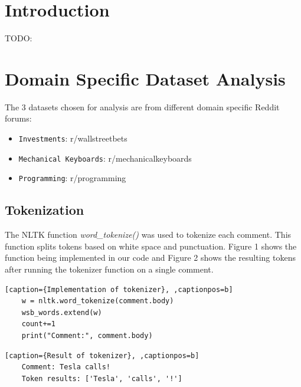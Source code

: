 \documentclass[sigconf,nonacm=true]{acmart}
\begin{document}
\maketitle

\section{Introduction}
TODO:

\section{Domain Specific Dataset Analysis}
The 3 datasets chosen for analysis are from different domain specific Reddit forums:
\begin{itemize}
	\item {\verb|Investments|}: r/wallstreetbets
	\item {\verb|Mechanical Keyboards|}: r/mechanicalkeyboards
	\item {\verb|Programming|}: r/programming
\end{itemize}

\subsection{Tokenization} 
The NLTK function \textit{word\_tokenize()} was used to tokenize each comment. This function splits tokens based on white space and punctuation. Figure 1 shows the function being implemented in our code and Figure 2 shows the resulting tokens after running the tokenizer function on a single comment. \bigskip

\renewcommand{\lstlistingname}{Figure}%
\renewcommand{\lstlistlistingname}{List of \lstlistingname s}%

\begin{lstlisting}[caption={Implementation of tokenizer}, ,captionpos=b]
    w = nltk.word_tokenize(comment.body)
    wsb_words.extend(w)
    count+=1
    print("Comment:", comment.body)
\end{lstlisting}


\begin{lstlisting}[caption={Result of tokenizer}, ,captionpos=b]
    Comment: Tesla calls!
    Token results: ['Tesla', 'calls', '!']
\end{lstlisting}
\end{document}
